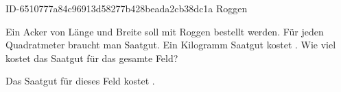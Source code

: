 \begin{exercise}
      {ID-6510777a84c96913d58277b428beada2cb38dc1a}
      {Roggen}
  \ifproblem\problem\par
    Ein Acker von  Länge und  Breite soll mit Roggen bestellt
    werden. Für jeden Quadratmeter braucht man  Saatgut. Ein Kilogramm
    Saatgut kostet . Wie viel kostet das Saatgut für das gesamte Feld?
  \fi
  \ifoutcome\outcome\par
    Das Saatgut für dieses Feld kostet .
  \fi
\end{exercise}
